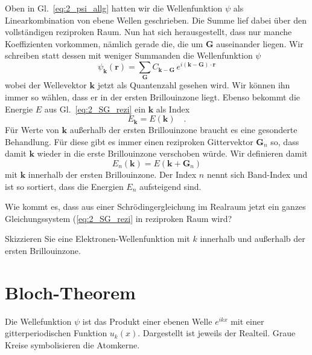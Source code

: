 Oben in Gl.~\ref{eq:2_psi_allg} hatten wir die Wellenfunktion $\psi$ als Linearkombination von ebene Wellen geschrieben. Die Summe lief dabei über den vollständigen  reziproken Raum.
Nun hat sich herausgestellt, dass nur manche Koeffizienten vorkommen, nämlich gerade die, die um $\mathbf{G}$ auseinander liegen.  Wir schreiben statt dessen mit weniger Summanden die Wellenfunktion $\psi$ 
\begin{equation}
    \psi_\mathbf{k}(\mathbf{r}) =  \sum_{\mathbf{G}} C_{\mathbf{k}-\mathbf{G}} \, e^{i (\mathbf{k}- \mathbf{G}) \cdot \mathbf{r} } 
\end{equation}
wobei der Wellevektor $\mathbf{k}$ jetzt als Quantenzahl gesehen wird. Wir können ihn immer so wählen, dass er in der ersten Brillouinzone liegt. Ebenso bekommt die Energie $E$ aus Gl.~\ref{eq:2_SG_rezi} ein   $\mathbf{k}$ als Index
\begin{equation}
    E_\mathbf{k} = E(\mathbf{k}) \quad .
\end{equation}
Für Werte von  $\mathbf{k}$ außerhalb der ersten Brillouinzone braucht es eine gesonderte Behandlung. Für diese gibt es immer einen  reziproken Gittervektor $\mathbf{G}_n$ so, dass damit $\mathbf{k}$ wieder in die erste Brillouinzone verschoben würde. Wir definieren damit
\begin{equation}
    E_n(\mathbf{k}) = E(\mathbf{k} + \mathbf{G}_n)
\end{equation}
mit $\mathbf{k}$ innerhalb der ersten Brillouinzone.
Der Index  $n$ nennt sich Band-Index und ist so sortiert, dass die Energien $E_n$ aufsteigend sind.

\begin{questions}
    \item Wie kommt es, dass aus einer Schrödingergleichung im Realraum jetzt ein ganzes Gleichungssystem (\ref{eq:2_SG_rezi} in reziproken Raum wird?
    \item Skizzieren Sie eine Elektronen-Wellenfunktion mit $k$ innerhalb und außerhalb der ersten Brillouinzone.
\end{questions}


\section{Bloch-Theorem}

\begin{marginfigure}
    \caption{Die Wellefunktion $\psi$ ist das Produkt einer ebenen Welle $e^{i k x}$ mit einer gitterperiodischen Funktion $u_k(x)$. Dargestellt ist jeweils der Realteil. Graue Kreise symbolisieren die Atomkerne. }
\end{marginfigure}



